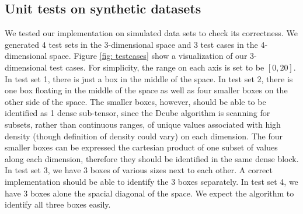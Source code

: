 
\subsection{Unit tests on synthetic datasets}
We tested our implementation on simulated data sets to check its correctness. We generated 4 test sets in the 3-dimensional space and 3 test cases in the 4-dimensional space. Figure \ref{fig: testcases} show a visualization of our 3-dimensional test cases. For simplicity, the range on each axis is set to be $[0, 20]$. In test set 1, there is just a box in the middle of the space. In test set 2, there is one box floating in the middle of the space as well as four smaller boxes on the other side of the space. The smaller boxes, however, should be able to be identified as 1 dense sub-tensor, since the Dcube algorithm is scanning for subsets, rather than continuous ranges, of unique values associated with high density (though definition of density could vary) on each dimension. The four smaller boxes can be expressed the cartesian product of one subset of values along each dimension, therefore they should be identified in the same dense block. In test set 3, we have 3 boxes of various sizes next to each other. A correct implementation should be able to identify the 3 boxes separately. In test set 4, we have  3 boxes alone the spacial diagonal of the space. We expect the algorithm to identify all three boxes easily.

